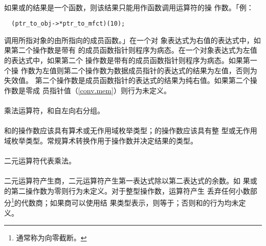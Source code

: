 \paragraph{}
如果或\tm{->*}的结果是一个函数，则该结果只能用作函数调用运算符\tm{()}的操
作数。「例：
\begin{lstlisting}
  (ptr_to_obj->*ptr_to_mfct)(10);
\end{lstlisting}
调用所指对象的由所指向的成员函数。」在一个对
象表达式为右值的表达式中，如果第二个操作数是带有\tm{\&}
的成员函数指针则程序为病态。在一个对象表达式为左值的表达式中，如果第二个
操作数是带有\tm{\&\&}的成员函数指针则程序为病态。如果第一个操
作数为左值则第二个操作数为数据成员指针的表达式的结果为左值，否则为失效值。
第二个操作数是成员函数指针的表达式的结果为纯右值。如果第二个操作数是零成
员指针值（\ref{conv.mem}）则行为未定义。

\paragraph{}
乘法运算符\tm{*}，\tm{/}和\tm{\%}自左向右分组。


\paragraph{}
\tm{*}和\tm{/}的操作数应该具有算术或无作用域枚举类型；\tm{\%}的操作数应该具有整
型或无作用域枚举类型。常规算术转换作用于操作数并决定结果的类型。

\paragraph{}
二元\tm{*}运算符代表乘法。

\paragraph{}
二元\tm{/}运算符产生商，二元\tm{\%}运算符产生第一表达式除以第二表达式的余数。如
果\tm{/}或\tm{\%}的第二操作数为零则行为未定义。对于整型操作数，\tm{/}运算符产生
丢弃任何小数部分\footnote{通常称为向零截断。}的代数商；如果商可以使用结
果类型表示，则等于；否则和的行为均未定
义。

